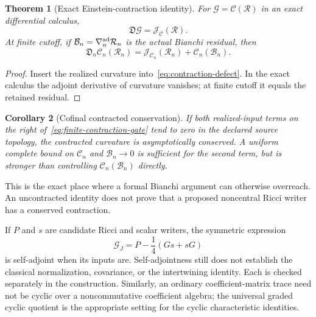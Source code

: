 \documentclass[11pt,a4paper,oneside]{book}
\theoremstyle{plain}
\newtheorem{theorem}{Theorem}[chapter]
\newtheorem{corollary}[theorem]{Corollary}
\theoremstyle{definition}
\theoremstyle{remark}
\newcommand{\src}[2]{\cite{#1}}
\begin{document}
\begin{theorem}[Exact Einstein-contraction identity]
\label{thm:einstein-contraction}
For $\mathcal G=\mathcal C(\mathcal R)$ in an exact differential calculus,
\begin{equation}
 \mathfrak D\mathcal G=\mathcal J_{\mathcal C}(\mathcal R).
 \label{eq:contraction-gate}
\end{equation}
At finite cutoff, if $\mathcal B_n=\nabla_n^{\rm ad}\mathcal R_n$ is the actual Bianchi residual, then
\begin{equation}
 \mathfrak D_n\mathcal C_n(\mathcal R_n)
 =\mathcal J_{\mathcal C_n}(\mathcal R_n)+\mathcal C_n(\mathcal B_n).
 \label{eq:finite-contraction-gate}
\end{equation}
\end{theorem}
\begin{proof}
Insert the realized curvature into~\eqref{eq:contraction-defect}. In the exact calculus the adjoint derivative of curvature vanishes; at finite cutoff it equals the retained residual.
\end{proof}
\src{R13}{thm:v13v96-gate}

\begin{corollary}[Cofinal contracted conservation]
If both realized-input terms on the right of~\eqref{eq:finite-contraction-gate} tend to zero in the declared source topology, the contracted curvature is asymptotically conserved. A uniform complete bound on $\mathcal C_n$ and $\mathcal B_n\to0$ is sufficient for the second term, but is stronger than controlling $\mathcal C_n(\mathcal B_n)$ directly.
\end{corollary}
\src{R13}{cor:v13v96-cofinal}
This is the exact place where a formal Bianchi argument can otherwise overreach. An uncontracted identity does not prove that a proposed noncentral Ricci writer has a conserved contraction.

If $P$ and $s$ are candidate Ricci and scalar writers, the symmetric expression
\begin{equation}
 \mathcal G_J=P-\frac14(Gs+sG)
 \label{eq:jordan-einstein}
\end{equation}
is self-adjoint when its inputs are. Self-adjointness still does not establish the classical normalization, covariance, or the intertwining identity. Each is checked separately in the construction. Similarly, an ordinary coefficient-matrix trace need not be cyclic over a noncommutative coefficient algebra; the universal graded cyclic quotient is the appropriate setting for the cyclic characteristic identities. \cite{R13}
\end{document}
